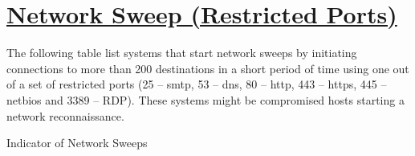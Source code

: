 %
%
%

\chapter[Network Sweep (Restricted Ports)]{\underline{Network Sweep (Restricted Ports)}}
\begin{flushleft}
The following table list systems that start network sweeps by initiating connections to more than 200 destinations in a
short period of time using one out of a set of restricted ports (25 – smtp, 53 – dns, 80 – http, 443 – https, 445 – netbios
and 3389 – RDP). These systems might be compromised hosts starting a network reconnaissance.
\end{flushleft}

\begin{table}[H]
  \begin{center}
    \caption[\normalsize{Indicator of Network Sweeps}]{\small{Indicator of Network Sweeps}}
  \end{center}
\end{table}
